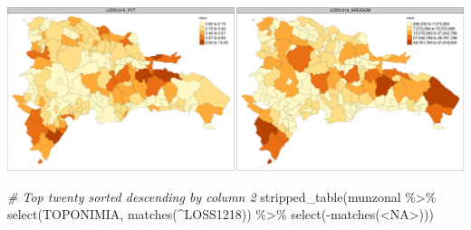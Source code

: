 \documentclass[10pt,landscape,a3paper]{article}
\newenvironment{Shaded}{\begin{snugshade}}{\end{snugshade}}
\newcommand{\CommentTok}[1]{\textcolor[rgb]{0.56,0.35,0.01}{\textit{#1}}}
\newcommand{\FunctionTok}[1]{\textcolor[rgb]{0.00,0.00,0.00}{#1}}
\newcommand{\NormalTok}[1]{#1}
\newcommand{\SpecialCharTok}[1]{\textcolor[rgb]{0.00,0.00,0.00}{#1}}
\newcommand{\StringTok}[1]{\textcolor[rgb]{0.31,0.60,0.02}{#1}}
\begin{document}
\begin{center}\includegraphics{img/data-download-preparation-eda/zonal-mun-5} \end{center}

\begin{Shaded}
\begin{Highlighting}[]
\CommentTok{\# Top twenty sorted descending by column 2}
\FunctionTok{stripped\_table}\NormalTok{(munzonal }\SpecialCharTok{\%\textgreater{}\%} \FunctionTok{select}\NormalTok{(TOPONIMIA, }\FunctionTok{matches}\NormalTok{(}\StringTok{\textquotesingle{}\^{}LOSS1218\textquotesingle{}}\NormalTok{)) }\SpecialCharTok{\%\textgreater{}\%} \FunctionTok{select}\NormalTok{(}\SpecialCharTok{{-}}\FunctionTok{matches}\NormalTok{(}\StringTok{\textquotesingle{}\textless{}NA\textgreater{}\textquotesingle{}}\NormalTok{)))}
\end{Highlighting}
\end{Shaded}
\end{document}
